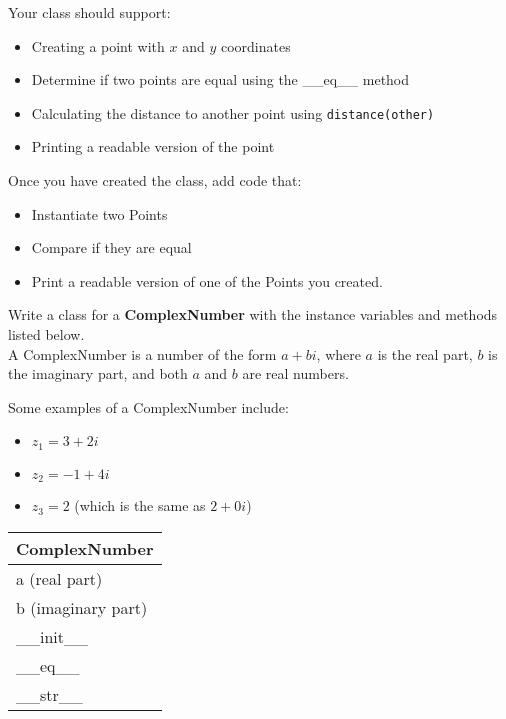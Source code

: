 		Your class should support:
		\begin{itemize}
			\item Creating a point with $x$ and $y$ coordinates
			\item Determine if two points are equal using the \_\_eq\_\_  method	
			\item Calculating the distance to another point using \texttt{distance(other)}
			\item Printing a readable version of the point
		\end{itemize}
		
		Once you have created the class, add code that:
		\begin{itemize}
			\item Instantiate two Points
			\item Compare if they are equal
			\item Print a readable version of one of the Points you created.
		\end{itemize}




	\item
		Write a class for a \textbf{ComplexNumber} with the instance variables and methods listed 
		below.\\
		A ComplexNumber is a number of the form $a + bi$, where $a$ is the real part, $b$ is 
		the imaginary part, and both $a$ and $b$ are real numbers. 
			
		\begin{minipage}[t]{0.7\textwidth}
			Some examples of a ComplexNumber include:
			\begin{itemize}
				\item $z_1 = 3 + 2i$
				\item $z_2 = -1 + 4i$
				\item $z_3 = 2$ (which is the same as $2 + 0i$)
			\end{itemize}
		\end{minipage}
		\hfill
		\begin{minipage}[t]{0.25\textwidth}
			\vspace{.2em}
			\begin{flushright}
				\begin{tabular}{|l|}
					\hline
					ComplexNumber \\ \hline
					a (real part) \\
					b (imaginary part) \\ \hline
					\_\_init\_\_ \\
					\_\_eq\_\_ \\
					\_\_str\_\_ \\ \hline
				\end{tabular}
			\end{flushright}
		\end{minipage}
		
